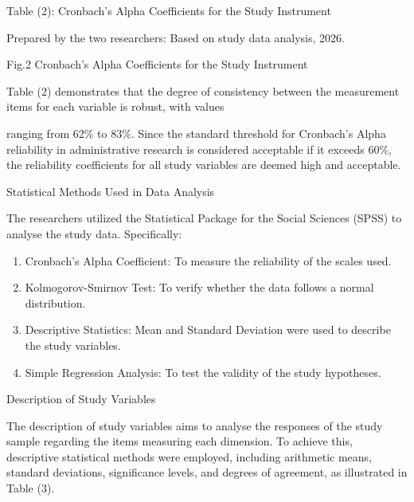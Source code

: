 \documentclass{default}
\begin{document}
Table (2): Cronbach’s Alpha Coefficients for the Study Instrument

\begin{table}[htbp]
\centering
{}
\caption{}

\end{table}

Prepared by the two researchers: Based on study data analysis, 2026.

Fig.2 Cronbach’s Alpha Coefficients for the Study Instrument

Table (2) demonstrates that the degree of consistency between the measurement items for each variable is robust, with values

ranging from 62\% to 83\%. Since the standard threshold for Cronbach’s Alpha reliability in administrative research is considered acceptable if it exceeds 60\%, the reliability coefficients for all study variables are deemed high and acceptable.

Statistical Methods Used in Data Analysis

The researchers utilized the Statistical Package for the Social Sciences (SPSS) to analyse the study data. Specifically:

\begin{enumerate}
  \item Cronbach’s Alpha Coefficient: To measure the reliability of the scales used.
  \item Kolmogorov-Smirnov Test: To verify whether the data follows a normal distribution.
  \item Descriptive Statistics: Mean and Standard Deviation were used to describe the study variables.
  \item Simple Regression Analysis: To test the validity of the study hypotheses.
\end{enumerate}

Description of Study Variables

The description of study variables aims to analyse the responses of the study sample regarding the items measuring each dimension. To achieve this, descriptive statistical methods were employed, including arithmetic means, standard deviations, significance levels, and degrees of agreement, as illustrated in Table (3).
\end{document}
